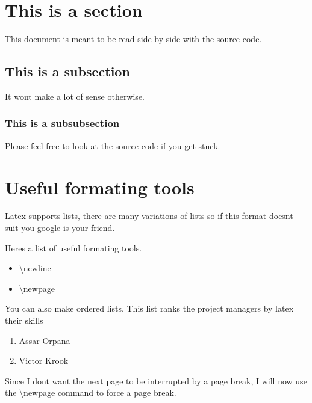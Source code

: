 \documentclass{article}
\date {#1}
\title {
    \documentNumber {01}    
    
    \documentVersion {0.1}
    
    \documentTitle {\LaTeX \hspace{} Lazy dog}
    \documentGroup {2}
    
    \documentResponsible {Project management Group}
    \documentAuthors {System architecture Group, Development Group}
    
    \documentDate {2021-01-25}
}
\begin{document}
\maketitle
\thispagestyle{empty}

\newpage

\tableofcontents

\newpage


\section{This is a section}
    This document is meant to be read side by side with the source code. 
    \subsection{This is a subsection}
        It wont make a lot of sense otherwise. 
        \subsubsection{This is a subsubsection}
            Please feel free to look at the source code if you get stuck. 
            
\section{Useful formating tools}
    Latex supports lists, there are many variations of lists so if this format doesnt suit you google is your friend. 
    
    Heres a list of useful formating tools. 
    \begin{itemize}
        \item \textbackslash newline %
        \item \textbackslash newpage
    \end{itemize}
    
    You can also make ordered lists. This list ranks the project managers by latex their skills
    
    \begin{enumerate}
        \item Assar Orpana
        \item Victor Krook
    \end{enumerate}
    
    Since I dont want the next page to be interrupted by a page break, I will now use the \textbackslash newpage command to force a page break. 
    \newpage
    
\end{document}
